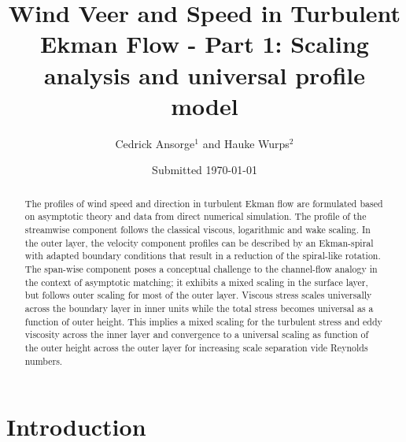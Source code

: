 \documentclass[smallcondensed,final]{svjour3}
\date{\scriptsize Submitted \today}
\title{Wind Veer and Speed in Turbulent Ekman Flow - Part 1: Scaling analysis and universal profile model}
\author{Cedrick Ansorge$^1$ and Hauke Wurps$^2$}
\institute{$^{1}$\,FU Berlin, Institut f\"ur Meteorologie, Carl-Heinrich-Becker-Weg 6--10, 12165 Berlin {cedrick@posteo.de}\\
  $^{2}$\,Uni Oldenburg 
  }
\begin{document}
 
%
\maketitle
%
\begin{abstract}
  The profiles of wind speed and direction in turbulent Ekman flow
  are formulated based on asymptotic theory and data from direct numerical simulation. 
  The profile of the streamwise component follows the classical viscous, logarithmic and wake scaling.
  In the outer layer, the velocity component profiles can be described by an Ekman-spiral with adapted
  boundary conditions that result in a reduction of the spiral-like rotation. 
  The span-wise component poses a conceptual challenge to the channel-flow analogy
  in the context of asymptotic matching; it exhibits a mixed scaling in the surface layer, but follows
  outer scaling for most of the outer layer.
  Viscous stress scales universally across the boundary layer in inner units while the total stress
  becomes universal as a function of outer height.
  This implies a mixed scaling for the turbulent stress and eddy viscosity across the inner layer
  and convergence to a universal scaling as function of the outer height across the outer layer
  for increasing scale separation vide Reynolds numbers. 
\end{abstract}
%
%
\section{Introduction}
\end{document}

